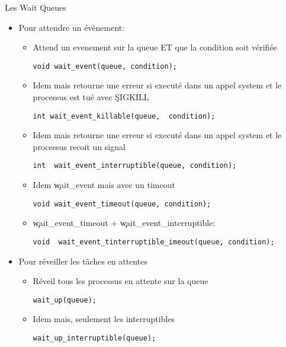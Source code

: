 \begin{frame}[fragile=singleslide]{Les Wait Queues}
  \begin{itemize} 
  \item Pour attendre un évènement:
    \begin{itemize} 
    \item Attend  un evenement sur la  queue ET que  la condition soit
      vérifiée
      \begin{lstlisting} 
void wait_event(queue, condition);
      \end{lstlisting} 
    \item  Idem mais  retourne une  erreur  si executé  dans un  appel
      system et le processus est tué avec \c{SIGKILL}
      \begin{lstlisting} 
int wait_event_killable(queue,  condition);
      \end{lstlisting} 
    \item  Idem mais  retourne une  erreur  si executé  dans un  appel
      system et le processus recoit un signal
      \begin{lstlisting} 
int  wait_event_interruptible(queue, condition);
      \end{lstlisting} 
    \item   Idem
      \c{wait_event} mais avec un timeout
      \begin{lstlisting} 
void wait_event_timeout(queue, condition);
      \end{lstlisting} 
    \item \c{wait_event_timeout} + \c{wait_event_interruptible}:
      \begin{lstlisting} 
void  wait_event_tinterruptible_imeout(queue, condition);
      \end{lstlisting} 
    \end{itemize} 
  \item Pour réveiller les tâches en attentes
    \begin{itemize} 
    \item Réveil tous les processus en attente sur la queue
      \begin{lstlisting} 
wait_up(queue); 
      \end{lstlisting} 
    \item Idem mais, seulement les interruptibles
      \begin{lstlisting}
wait_up_interruptible(queue);
      \end{lstlisting} 
    \end{itemize}
  \end{itemize}  
\end{frame} 

